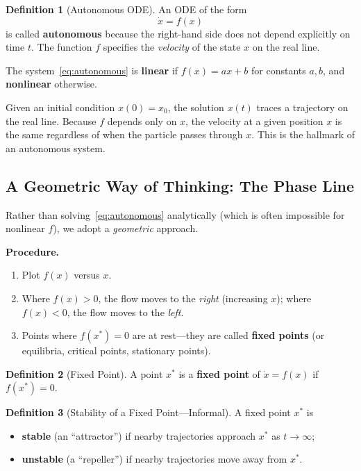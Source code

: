 \documentclass[11pt,letterpaper]{article}
\theoremstyle{definition}
\newtheorem{definition}{Definition}[section]
\theoremstyle{plain}
\theoremstyle{remark}
\newcommand{\xdot}{\dot{x}}
\newcommand{\xstar}{x^*}
\begin{document}
\begin{definition}[Autonomous ODE]
An ODE of the form
\begin{equation}\label{eq:autonomous}
  \xdot = f(x)
\end{equation}
is called \textbf{autonomous} because the right-hand side does not depend
explicitly on time $t$.  The function $f$ specifies the \emph{velocity}
of the state $x$ on the real line.
\end{definition}

The system~\eqref{eq:autonomous} is \textbf{linear} if $f(x)=ax+b$ for
constants $a,b$, and \textbf{nonlinear} otherwise.

Given an initial condition $x(0)=x_0$, the solution $x(t)$ traces a
trajectory on the real line.  Because $f$ depends only on $x$, the velocity
at a given position $x$ is the same regardless of when the particle passes
through $x$.  This is the hallmark of an autonomous system.

\subsection{A Geometric Way of Thinking: The Phase Line}

Rather than solving~\eqref{eq:autonomous} analytically (which is often
impossible for nonlinear $f$), we adopt a \emph{geometric} approach.

\medskip\noindent\textbf{Procedure.}
\begin{enumerate}[leftmargin=2em]
\item Plot $f(x)$ versus $x$.
\item Where $f(x)>0$, the flow moves to the \emph{right} (increasing $x$);
      where $f(x)<0$, the flow moves to the \emph{left}.
\item Points where $f(\xstar)=0$ are at rest---they are called
      \textbf{fixed points} (or equilibria, critical points, stationary
      points).
\end{enumerate}

\begin{definition}[Fixed Point]
A point $\xstar$ is a \textbf{fixed point} of $\xdot = f(x)$ if
$f(\xstar)=0$.
\end{definition}

\begin{definition}[Stability of a Fixed Point---Informal]
A fixed point $\xstar$ is
\begin{itemize}[leftmargin=2em]
\item \textbf{stable} (an ``attractor'') if nearby trajectories approach
      $\xstar$ as $t\to\infty$;
\item \textbf{unstable} (a ``repeller'') if nearby trajectories move away
      from $\xstar$.
\end{itemize}
\end{definition}
\end{document}
